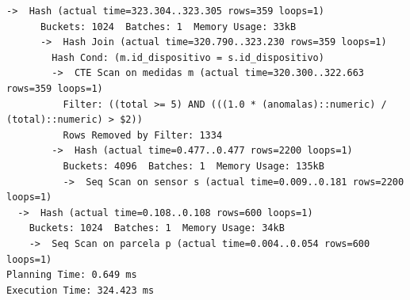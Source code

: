 \documentclass[11pt,letterpaper]{article}
\begin{document}
\begin{lstlisting}[style=plano]
    ->  Hash (actual time=323.304..323.305 rows=359 loops=1)
      Buckets: 1024  Batches: 1  Memory Usage: 33kB
      ->  Hash Join (actual time=320.790..323.230 rows=359 loops=1)
        Hash Cond: (m.id_dispositivo = s.id_dispositivo)
        ->  CTE Scan on medidas m (actual time=320.300..322.663 rows=359 loops=1)
          Filter: ((total >= 5) AND (((1.0 * (anomalas)::numeric) / (total)::numeric) > $2))
          Rows Removed by Filter: 1334
        ->  Hash (actual time=0.477..0.477 rows=2200 loops=1)
          Buckets: 4096  Batches: 1  Memory Usage: 135kB
          ->  Seq Scan on sensor s (actual time=0.009..0.181 rows=2200 loops=1)
  ->  Hash (actual time=0.108..0.108 rows=600 loops=1)
    Buckets: 1024  Batches: 1  Memory Usage: 34kB
    ->  Seq Scan on parcela p (actual time=0.004..0.054 rows=600 loops=1)
Planning Time: 0.649 ms
Execution Time: 324.423 ms
\end{lstlisting}
\end{document}
